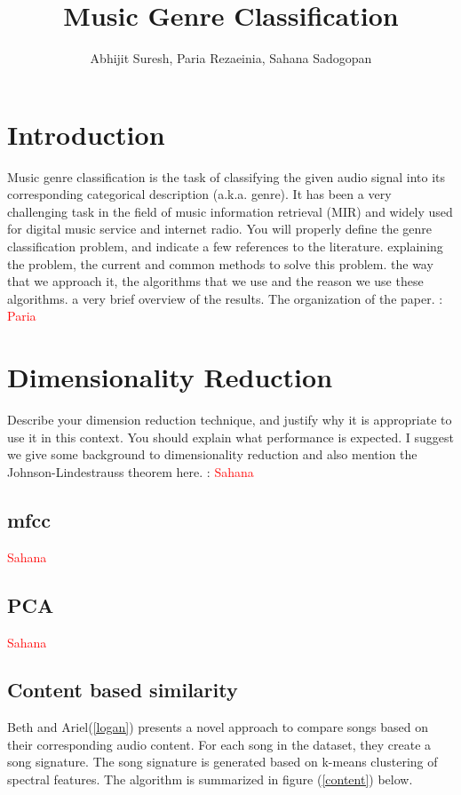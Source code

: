 \documentclass[12pt]{article}
\title{Music Genre Classification}
\author{Abhijit Suresh, Paria Rezaeinia, Sahana Sadogopan}
\begin{document}
	\maketitle

\section{Introduction}

Music genre classification is the task of classifying the given audio signal into its corresponding categorical description (a.k.a. genre). It has been a very challenging task in the field of music information retrieval (MIR) and widely used for digital music service and internet radio.
You will properly define the genre classification problem, and
indicate a few references to the literature.
explaining the problem, the current and common methods to solve this problem. the way that we approach it, the algorithms that we use and the reason we use these algorithms. a very brief overview of the results. The organization of the paper. : \textcolor{red}{Paria}
\section{Dimensionality Reduction}
Describe your dimension reduction technique, and justify why it
is appropriate to use it in this context. You should explain what
performance is expected.
I suggest we give some background to dimensionality reduction and also mention the Johnson-Lindestrauss theorem here. : \textcolor{red}{Sahana}
\subsection{mfcc} \textcolor{red}{Sahana}

\subsection{PCA} \textcolor{red}{Sahana}

\subsection{Content based similarity}
Beth and Ariel(\ref{logan}) presents a novel approach to compare songs based on their corresponding audio content. For each song in the dataset, they create a song signature. The song signature is generated based on k-means clustering of spectral features. The algorithm is summarized in figure (\ref{content}) below.
\end{document}

